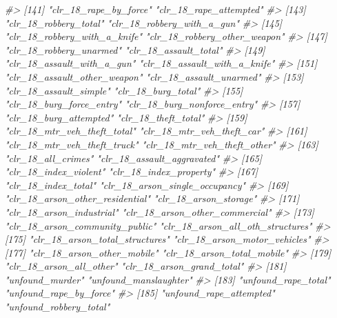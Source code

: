 \documentclass[
]{krantz}
\makeatletter
\newenvironment{Shaded}{\begin{snugshade}}{\end{snugshade}}
\newcommand{\CommentTok}[1]{\textcolor[rgb]{0.37,0.37,0.37}{\textit{#1}}}
\newenvironment{kframe}{%
\medskip{}
\setlength{\fboxsep}{.8em}
 \def\at@end@of@kframe{}%
 \ifinner\ifhmode%
  \def\at@end@of@kframe{\end{minipage}}%
  \begin{minipage}{\columnwidth}%
 \fi\fi%
 \def\FrameCommand##1{\hskip\@totalleftmargin \hskip-\fboxsep
 \colorbox{shadecolor}{##1}\hskip-\fboxsep
     \hskip-\linewidth \hskip-\@totalleftmargin \hskip\columnwidth}%
 \MakeFramed {\advance\hsize-\width
   \@totalleftmargin\z@ \linewidth\hsize
   \@setminipage}}%
 {\par\unskip\endMakeFramed%
 \at@end@of@kframe}
\renewenvironment{Shaded}{\begin{kframe}}{\end{kframe}}
\makeatother
\begin{document}
\begin{Shaded}
\begin{Highlighting}[]
\CommentTok{\#\textgreater{} [141] "clr\_18\_rape\_by\_force"             "clr\_18\_rape\_attempted"           }
\CommentTok{\#\textgreater{} [143] "clr\_18\_robbery\_total"             "clr\_18\_robbery\_with\_a\_gun"       }
\CommentTok{\#\textgreater{} [145] "clr\_18\_robbery\_with\_a\_knife"      "clr\_18\_robbery\_other\_weapon"     }
\CommentTok{\#\textgreater{} [147] "clr\_18\_robbery\_unarmed"           "clr\_18\_assault\_total"            }
\CommentTok{\#\textgreater{} [149] "clr\_18\_assault\_with\_a\_gun"        "clr\_18\_assault\_with\_a\_knife"     }
\CommentTok{\#\textgreater{} [151] "clr\_18\_assault\_other\_weapon"      "clr\_18\_assault\_unarmed"          }
\CommentTok{\#\textgreater{} [153] "clr\_18\_assault\_simple"            "clr\_18\_burg\_total"               }
\CommentTok{\#\textgreater{} [155] "clr\_18\_burg\_force\_entry"          "clr\_18\_burg\_nonforce\_entry"      }
\CommentTok{\#\textgreater{} [157] "clr\_18\_burg\_attempted"            "clr\_18\_theft\_total"              }
\CommentTok{\#\textgreater{} [159] "clr\_18\_mtr\_veh\_theft\_total"       "clr\_18\_mtr\_veh\_theft\_car"        }
\CommentTok{\#\textgreater{} [161] "clr\_18\_mtr\_veh\_theft\_truck"       "clr\_18\_mtr\_veh\_theft\_other"      }
\CommentTok{\#\textgreater{} [163] "clr\_18\_all\_crimes"                "clr\_18\_assault\_aggravated"       }
\CommentTok{\#\textgreater{} [165] "clr\_18\_index\_violent"             "clr\_18\_index\_property"           }
\CommentTok{\#\textgreater{} [167] "clr\_18\_index\_total"               "clr\_18\_arson\_single\_occupancy"   }
\CommentTok{\#\textgreater{} [169] "clr\_18\_arson\_other\_residential"   "clr\_18\_arson\_storage"            }
\CommentTok{\#\textgreater{} [171] "clr\_18\_arson\_industrial"          "clr\_18\_arson\_other\_commercial"   }
\CommentTok{\#\textgreater{} [173] "clr\_18\_arson\_community\_public"    "clr\_18\_arson\_all\_oth\_structures" }
\CommentTok{\#\textgreater{} [175] "clr\_18\_arson\_total\_structures"    "clr\_18\_arson\_motor\_vehicles"     }
\CommentTok{\#\textgreater{} [177] "clr\_18\_arson\_other\_mobile"        "clr\_18\_arson\_total\_mobile"       }
\CommentTok{\#\textgreater{} [179] "clr\_18\_arson\_all\_other"           "clr\_18\_arson\_grand\_total"        }
\CommentTok{\#\textgreater{} [181] "unfound\_murder"                   "unfound\_manslaughter"            }
\CommentTok{\#\textgreater{} [183] "unfound\_rape\_total"               "unfound\_rape\_by\_force"           }
\CommentTok{\#\textgreater{} [185] "unfound\_rape\_attempted"           "unfound\_robbery\_total"           }

\end{Highlighting}
\end{Shaded}
\end{document}

